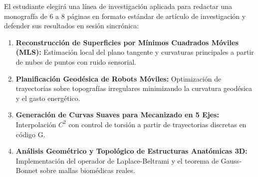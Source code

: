 \documentclass[11pt, a4paper]{article}
\begin{document}
	El estudiante elegirá una línea de investigación aplicada para redactar una monografía de 6 a 8 páginas en formato estándar de artículo de investigación y defender sus resultados en sesión sincrónica:
	
	\begin{enumerate}
		\item \textbf{Reconstrucción de Superficies por Mínimos Cuadrados Móviles (MLS):} Estimación local del plano tangente y curvaturas principales a partir de nubes de puntos con ruido sensorial.
		\item \textbf{Planificación Geodésica de Robots Móviles:} Optimización de trayectorias sobre topografías irregulares minimizando la curvatura geodésica y el gasto energético.
		\item \textbf{Generación de Curvas Suaves para Mecanizado en 5 Ejes:} Interpolación $C^2$ con control de torsión a partir de trayectorias discretas en código G.
		\item \textbf{Análisis Geométrico y Topológico de Estructuras Anatómicas 3D:} Implementación del operador de Laplace-Beltrami y el teorema de Gauss-Bonnet sobre mallas biomédicas reales.
	\end{enumerate}
	

	
\end{document}
